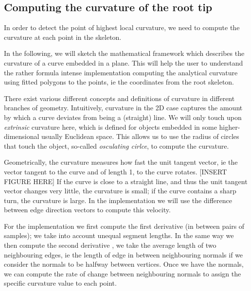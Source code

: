 \subsection{Computing the curvature of the root tip}


In order to detect the point of highest local curvature, we need to compute the curvature at each point in the skeleton. 


In the following, we will sketch the mathematical framework which describes the curvature of a curve embedded in a plane.
This will help the user to understand the rather formula intense implementation computing the analytical curvature using fitted polygons to the points, ie the coordinates from the root skeleton.

There exist various different concepts and definitions of curvature in different branches of geometry.
Intuitively, curvature in the 2D case captures the amount by which a curve deviates from being a (straight) line.
We will only touch upon \textit{extrinsic} curvature here, which is defined for objects embedded in some higher-dimensional usually Euclidean space. This allows us to use the radius of circles that touch the object, so-called \textit{osculating cirlce}, to compute the curvature.


Geometrically, the curvature measures how fast the unit tangent vector, ie the vector tangent to the curve and of length 1,  to the curve rotates. 
[INSERT FIGURE HERE]
If the curve is close to a straight line, and thus the unit tangent vector changes very little, the curvature is small; if the curve contains a sharp turn, the curvature is large.
In the implementation we will use the difference between edge direction vectors to compute this velocity.




For the implementation we first compute the first derivative (in between pairs of samples); we take into account unequal segment lengths. In the same way we then compute the second derivative , we take the average length of two neighbouring edges, ie the length of edge in between neighbouring normals if we consider the normals to be halfway between vertices.
Once we have the normals, we can compute the rate of change between neighbouring normals to assign the specific curvature value to each point.

